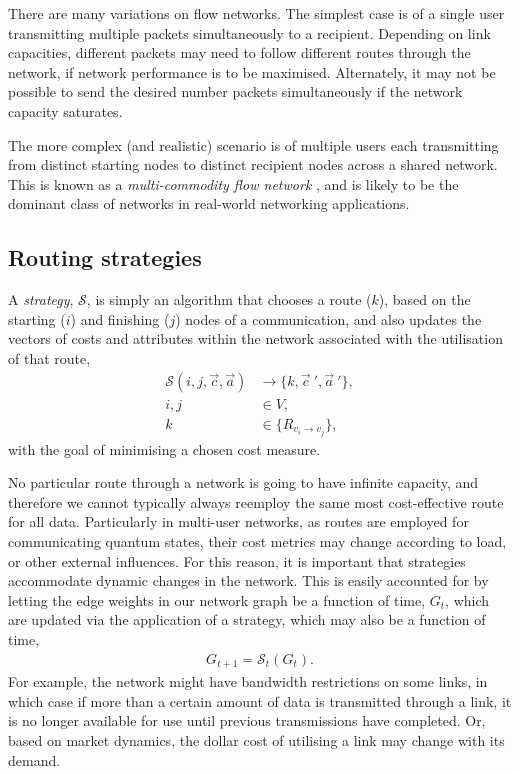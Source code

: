 \documentclass[aps,rmp,twocolumn,amsmath,amssymb,nofootinbib,superscriptaddress]{revtex4}
\begin{document}
There are many variations on flow networks. The simplest case is of a single user transmitting multiple packets simultaneously to a recipient. Depending on link capacities, different packets may need to follow different routes through the network, if network performance is to be maximised. Alternately, it may not be possible to send the desired number packets simultaneously if the network capacity saturates.

The more complex (and realistic) scenario is of multiple users each transmitting from distinct starting nodes to distinct recipient nodes across a shared network. This is known as a \emph{multi-commodity flow network} \cite{???}, and is likely to be the dominant class of networks in real-world networking applications.

%
%

\subsection{Routing strategies} \label{sec:route_strats}

A \emph{strategy}, $\mathcal{S}$, is simply an algorithm that chooses a route ($k$), based on the starting ($i$) and finishing ($j$) nodes of a communication, and also updates the vectors of costs and attributes within the network associated with the utilisation of that route,
\begin{align}
\mathcal{S}(i,j,\vec{c},\vec{a}) &\to \{k,{\vec{c}}~',{\vec{a}}~'\}, \nonumber \\
i,j &\in V, \nonumber\\
k &\in \{R_{v_i\to v_j}\},
\end{align}
with the goal of minimising a chosen cost measure.

No particular route through a network is going to have infinite capacity, and therefore we cannot typically always reemploy the same most cost-effective route for all data. Particularly in multi-user networks, as routes are employed for communicating quantum states, their cost metrics may change according to load, or other external influences. For this reason, it is important that strategies accommodate dynamic changes in the network. This is easily accounted for by letting the edge weights in our network graph be a function of time, $G_t$, which are updated via the application of a strategy, which may also be a function of time,
\begin{align} \label{eq:S_G}
G_{t+1} = \mathcal{S}_t(G_t).
\end{align}
For example, the network might have bandwidth restrictions on some links, in which case if more than a certain amount of data is transmitted through a link, it is no longer available for use until previous transmissions have completed. Or, based on market dynamics, the dollar cost of utilising a link may change with its demand.
\end{document}
